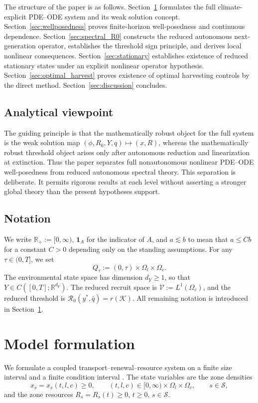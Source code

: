 \documentclass[pdflatex,sn-mathphys-num]{sn-jnl}%
\begin{document}
The structure of the paper is as follows.
Section~\ref{sec:model} formulates the full climate-explicit PDE--ODE system and its
weak solution concept.
Section~\ref{sec:wellposedness} proves finite-horizon well-posedness and continuous
dependence.
Section~\ref{sec:spectral_R0} constructs the reduced autonomous next-generation
operator, establishes the threshold sign principle, and derives
local nonlinear consequences.
Section~\ref{sec:stationary} establishes existence of reduced stationary states under
an explicit nonlinear operator hypothesis.
Section~\ref{sec:optimal_harvest} proves existence of optimal harvesting controls by the
direct method. Section~\ref{sec:discussion} concludes.

\subsection{Analytical viewpoint}
The guiding principle is that the mathematically robust object for the full system is
the weak solution map
\((\phi,R_0,Y,q)\longmapsto (x,R)\),
whereas the mathematically robust threshold object arises only after autonomous
reduction and linearization at extinction. Thus the paper separates
full nonautonomous nonlinear PDE--ODE well-posedness from
reduced autonomous spectral theory.
This separation is deliberate. It permits rigorous results at each level without
asserting a stronger global theory than the present hypotheses support.

\subsection{Notation}
We write
\(
\mathbb R_+:=[0,\infty)\), \(\mathbf 1_A\) for the indicator of \(A\), and
\(a\lesssim b\)
to mean that \(a\le Cb\) for a constant \(C>0\) depending only on the standing
assumptions. For any \(\tau\in(0,T]\), we set
\[
Q_\tau:=(0,\tau)\times\Omega_l\times\Omega_c.
\]
The environmental state space has dimension \(d_Y\ge 1\), so that
\(Y\in C([0,T];\mathbb R^{d_Y})\). The reduced recruit space is
\(\mathcal V:=L^1(\Omega_c)\),
and the reduced threshold is
\(\mathcal R_0(y^\ast,\bar q)=r(\mathcal K)\).
All remaining notation is introduced in Section~\ref{sec:model}.


\section{Model formulation}\label{sec:model}
We formulate a coupled transport--renewal--resource system on a finite size interval and
a finite condition interval
\cite{MetzDiekmann1986,Webb1985,ni2024nonautonomous,liang2025global,GyllenbergWebb1990,hu2022dynamical,DiekmannGyllenberg2012,diekmann2020finite,liu2026ftu}.
The state variables are the zone densities
\[
x_s=x_s(t,l,c)\ge 0,
\qquad
(t,l,c)\in [0,\infty)\times\Omega_l\times\Omega_c,
\qquad s\in\mathcal S,
\]
and the zone resources
\(R_s=R_s(t)\ge 0\), \(t\ge 0\), \(s\in\mathcal S\).
\end{document}
